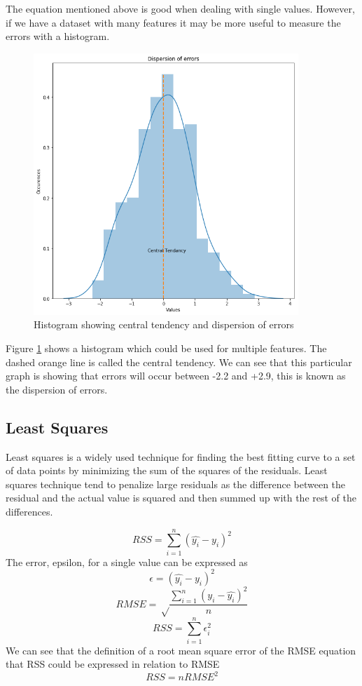 The equation mentioned above is good when dealing with single values. However, if we have a dataset with many features it may be more useful to measure the errors with a histogram.

\begin{figure}[H]
  \centering
  \includegraphics[scale=0.5,width=100mm]{./images/graph-histogram.png}
  \caption{Histogram showing central tendency and dispersion of errors}
  \label{fig:graph-histogram}
\end{figure}
Figure \ref{fig:graph-histogram} shows a histogram which could be used for multiple features. The dashed orange line is called the central tendency. We can see that this particular graph is showing that errors will occur between -2.2 and +2.9, this is known as the dispersion of errors.

\subsection{Least Squares}

Least squares is a widely used technique for finding the best fitting curve to a set of data points by minimizing the sum of the squares of the residuals. Least squares technique tend to penalize large residuals as the difference between the residual and the actual value is squared and then summed up with the rest of the differences.

\begin{equation}
RSS=\sum^n_{i=1}(\hat{y_i}- y_i)^2
\end{equation}
The error, epsilon, for a single value can be expressed as
\begin{equation}
\epsilon = (\hat{y_i}- y_i)^2
\end{equation}
\begin{equation}
RMSE = \sqrt\frac{\sum\limits_{i=1}^{n}(y_i-\hat{y_i})^2}{n}
\end{equation}
\begin{equation}
RSS = \sum^n_{i=1}\epsilon_i^2
\end{equation}
We can see that the definition of a root mean square error of the RMSE equation that RSS could be expressed in relation to RMSE
\begin{equation}
RSS = nRMSE^2
\end{equation}

